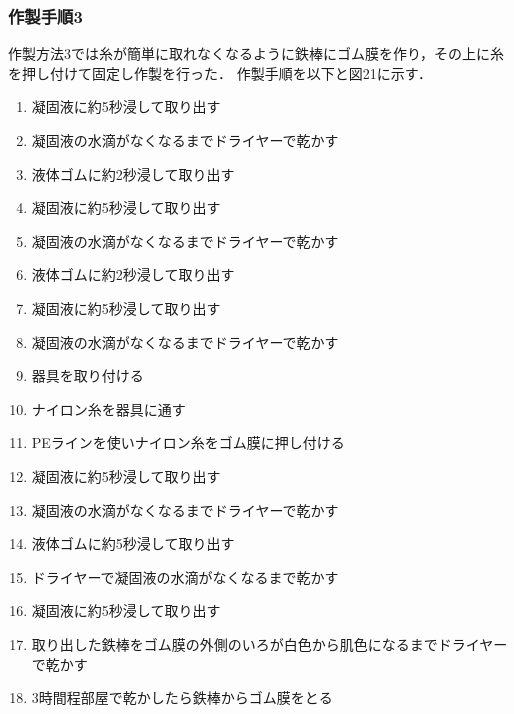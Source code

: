 \subsubsection{作製手順3}
作製方法3では糸が簡単に取れなくなるように鉄棒にゴム膜を作り，その上に糸を押し付けて固定し作製を行った．
作製手順を以下と図21に示す．
\begin{enumerate}
  \item 凝固液に約5秒浸して取り出す
  \item 凝固液の水滴がなくなるまでドライヤーで乾かす
  \item 液体ゴムに約2秒浸して取り出す
  \item 凝固液に約5秒浸して取り出す
  \item 凝固液の水滴がなくなるまでドライヤーで乾かす
  \item 液体ゴムに約2秒浸して取り出す
  \item 凝固液に約5秒浸して取り出す
  \item 凝固液の水滴がなくなるまでドライヤーで乾かす
  \item 器具を取り付ける
  \item ナイロン糸を器具に通す
  \item PEラインを使いナイロン糸をゴム膜に押し付ける
  \item 凝固液に約5秒浸して取り出す
  \item 凝固液の水滴がなくなるまでドライヤーで乾かす
  \item 液体ゴムに約5秒浸して取り出す
  \item ドライヤーで凝固液の水滴がなくなるまで乾かす
  \item 凝固液に約5秒浸して取り出す
  \item 取り出した鉄棒をゴム膜の外側のいろが白色から肌色になるまでドライヤーで乾かす
  \item 3時間程部屋で乾かしたら鉄棒からゴム膜をとる
\end{enumerate}
　


